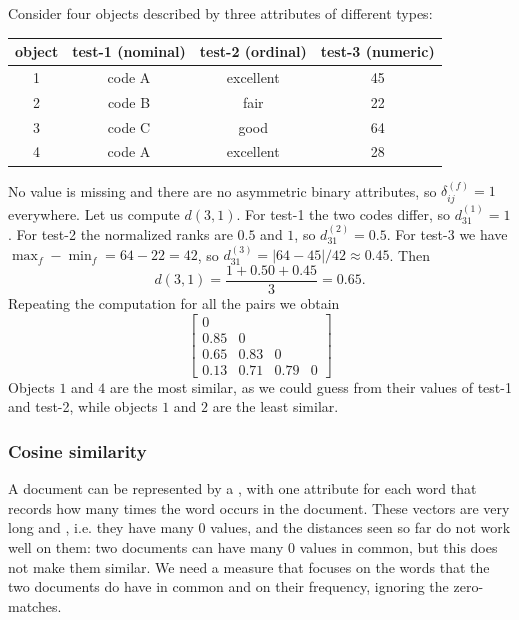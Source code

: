 \begin{example}
Consider four objects described by three attributes of different types:
\begin{center}
\begin{tabular}{cccc}
    \toprule
    object & test-1 (nominal) & test-2 (ordinal) & test-3 (numeric) \\
    \midrule
    1 & code A & excellent & 45 \\
    2 & code B & fair      & 22 \\
    3 & code C & good      & 64 \\
    4 & code A & excellent & 28 \\
    \bottomrule
\end{tabular}
\end{center}
No value is missing and there are no asymmetric binary attributes, so $\delta_{ij}^{(f)}=1$ everywhere. Let us compute $d(3,1)$. For test-1 the two codes differ, so $d_{31}^{(1)}=1$. For test-2 the normalized ranks are $0.5$ and $1$, so $d_{31}^{(2)}=0.5$. For test-3 we have $\max_f-\min_f=64-22=42$, so $d_{31}^{(3)}=|64-45|/42\approx 0.45$. Then
\[
    d(3,1)=\frac{1+0.50+0.45}{3}=0.65.
\]
Repeating the computation for all the pairs we obtain
\[
    \begin{bmatrix}
        0    &      &      &   \\
        0.85 & 0    &      &   \\
        0.65 & 0.83 & 0    &   \\
        0.13 & 0.71 & 0.79 & 0
    \end{bmatrix}
\]
Objects $1$ and $4$ are the most similar, as we could guess from their values of test-1 and test-2, while objects $1$ and $2$ are the least similar.
\end{example}

\subsubsection{Cosine similarity}
A document can be represented by a , with one attribute for each word that records how many times the word occurs in the document. These vectors are very long and , i.e. they have many $0$ values, and the distances seen so far do not work well on them: two documents can have many $0$ values in common, but this does not make them similar. We need a measure that focuses on the words that the two documents do have in common and on their frequency, ignoring the zero-matches.

